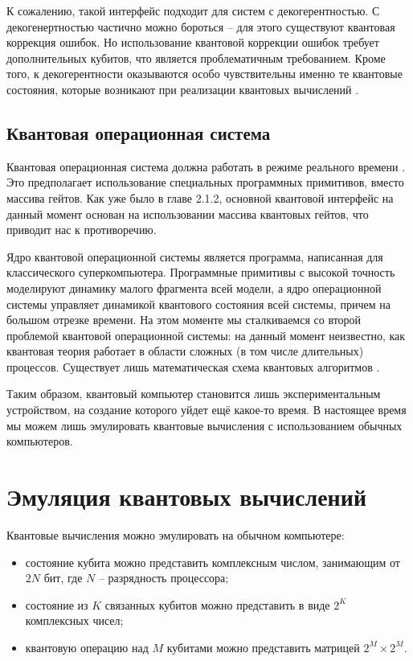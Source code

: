 К сожалению, такой интерфейс подходит для систем с декогерентностью. С декогенертностью частично можно бороться \cite{quantum-codes} -- для этого существуют квантовая коррекция ошибок. Но использование квантовой коррекции ошибок требует дополнительных кубитов, что является проблематичным требованием. Кроме того, к декогерентности оказываются особо чувствительны именно те квантовые состояния, которые возникают при реализации квантовых вычислений \cite{quantum-computer}.

\subsection{Квантовая операционная система}

Квантовая операционная система должна работать в режиме реального времени \cite{quantum-computer}. Это предполагает использование специальных программных примитивов, вместо массива гейтов. Как уже было в главе 2.1.2, основной квантовой интерфейс на данный момент основан на использовании массива квантовых гейтов, что приводит нас к противоречию. 

Ядро квантовой операционной системы является программа, написанная для классического суперкомпьютера. Программные примитивы с высокой точность моделируют динамику малого фрагмента всей модели, а ядро операционной системы управляет динамикой квантового состояния всей системы, причем на большом отрезке времени. На этом моменте мы сталкиваемся со второй проблемой квантовой операционной системы: на данный момент неизвестно, как квантовая теория работает в области сложных (в том числе длительных) процессов. Существует лишь математическая схема квантовых алгоритмов \cite{quantum-computer}.

Таким образом, квантовый компьютер становится лишь экспериментальным устройством, на создание которого уйдет ещё какое-то время. В настоящее время мы можем лишь эмулировать квантовые вычисления с использованием обычных компьютеров.

\section{Эмуляция квантовых вычислений}

Квантовые вычисления можно эмулировать на обычном компьютере:

\begin{itemize}
	\item состояние кубита можно представить комплексным числом, занимающим от $2N$ бит, где $N$ -- разрядность процессора;
	\item состояние из $K$ связанных кубитов можно представить в виде $2^K$ комплексных чисел;
	\item квантовую операцию над $M$ кубитами можно представить матрицей $2^M \times 2^M$.
\end{itemize}

